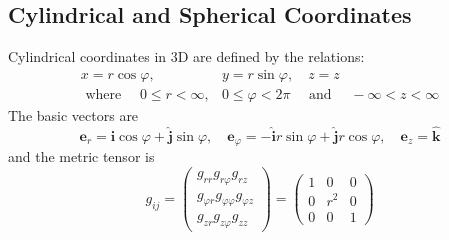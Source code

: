 \subsection{Cylindrical and Spherical Coordinates}
 Cylindrical coordinates in 3D are defined by the relations:
 $$
\begin{aligned}
x=r \cos \varphi, & y=r \sin \varphi, \quad z=z \\
\text { where } \quad 0 \leq r<\infty, & 0 \leq \varphi<2 \pi \quad \text { and } \quad-\infty<z<\infty
\end{aligned}
$$
The basic vectors are
$$
\mathbf{e}_{r}=\hat{\mathbf{i}} \cos \varphi+\hat{\mathbf{j}} \sin \varphi, \quad \mathbf{e}_{\varphi}=-\hat{\mathbf{i}} r \sin \varphi+\hat{\mathbf{j}} r \cos \varphi, \quad \mathbf{e}_{z}=\hat{\mathbf{k}}
$$
and the metric tensor is
\begin{equation}
g_{i j}=\left(\begin{array}{l}
{g_{r r} g_{r \varphi} g_{r z}} \\
{g_{\varphi r} g_{\varphi \varphi} g_{\varphi z}} \\
{g_{z r} g_{z \varphi} g_{z z}}
\end{array}\right)=\left(\begin{array}{ccc}
{1} & {0} & {0} \\
{0} & {r^{2}} & {0} \\
{0} & {0} & {1}
\end{array}\right)
\end{equation}

